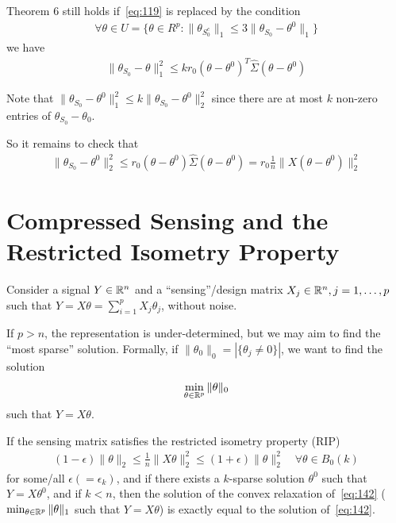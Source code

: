 \begin{corollary}
  Theorem 6 still holds if~\eqref{eq:119} is replaced by the condition
  \begin{align}
    \label{eq:139}
    \forall \theta \in U = \{ \theta \in R^{p}: \| \theta_{S_{0}^{c}}
    \|_{1} \leq 3 \| \theta_{S_{0}} - \theta^{0} \|_{1} \}
  \end{align} we have
  \begin{align}
    \label{eq:140}
    \| \theta_{S_{0}} - \theta \|_{1}^{2} \leq k r_{0} (\theta -
    \theta^{0})^{T} \hat \Sigma (\theta - \theta^{0})
  \end{align}

  Note that $\| \theta_{S_{0}} - \theta^{0} \|_{1}^{2} \leq k \|
  \theta_{S_{0}} - \theta^{0} \|_{2}^{2}$ since there are at most $k$
  non-zero entries of $\theta_{S_{0}} - \theta_{0}$.
\end{corollary}

So it remains to check that
\begin{align}
  \label{eq:141}
  \| \theta_{S_{0}} - \theta^{0} \|_{2}^{2} \leq r_{0} (\theta -
  \theta^{0}) \hat \Sigma (\theta - \theta^{0}) = r_{0} \frac{1}{n} \|
  X(\theta - \theta^{0}) \|_{2}^{2}
\end{align}

\section{Compressed Sensing and the Restricted Isometry Property}
\label{sec:compr-sens-restr}

Consider a signal $Y \in \mathbb{R}^{n}$ and a ``sensing''/design matrix
$X_{j} \in \mathbb{R}^{n}, j = 1, \dots, p$ such that $Y = X \theta =
\sum_{i=1}^{p} X_{j} \theta_{j}$, without noise.

If $p > n$, the representation is under-determined, but we may aim to
find the ``most sparse'' solution.  Formally, if $\| \theta_{0} \|_{0}
= |\{ \theta_{j} \neq 0 \}|$, we want to find the solution
\begin{align}
  \label{eq:142}
  \min_{\theta \in \mathbb{R}^{p}} \| \theta \|_{0}
\end{align} such that $Y = X \theta$.

If the sensing matrix satisfies the restricted isometry property (RIP)
\begin{align}
  \label{eq:143}
  (1 - \epsilon) \| \theta \|_{2} \leq \frac{1}{n} \| X \theta
  \|_{2}^{2} \leq (1 + \epsilon) \| \theta \|_{2}^{2} \quad \forall \theta
  \in B_{0}(k)
\end{align} for some/all $\epsilon (=\epsilon_{k})$, and if there
exists a $k$-sparse solution $\theta^{0}$ such that $Y = X
\theta^{0}$, and if $k < n$, then the solution of the convex relaxation
of~\eqref{eq:142} ($\min_{\theta \in \mathbb{R}^{p}} \| \theta \|_{1}$ such
that $Y = X \theta$) is exactly equal to the solution
of~\eqref{eq:142}.

